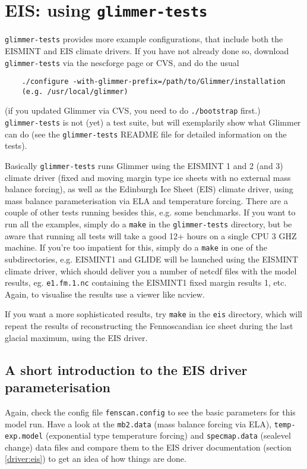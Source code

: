 
\section{EIS: using \texttt{glimmer-tests}}
\texttt{glimmer-tests} provides more example configurations, that include both the EISMINT
and EIS climate drivers. If you have not already done so, download
\texttt{glimmer-tests} via the nescforge page or CVS, and do the usual
\begin{verbatim}
    ./configure -with-glimmer-prefix=/path/to/Glimmer/installation
    (e.g. /usr/local/glimmer)
\end{verbatim}
(if you updated Glimmer via CVS, you need to do \texttt{./bootstrap} first.)\\
\texttt{glimmer-tests} is not (yet) a test suite, but will exemplarily show
what Glimmer can do (see the \texttt{glimmer-tests} README file for detailed
information on the tests).

Basically \texttt{glimmer-tests} runs Glimmer using the EISMINT 1 and 2 (and 3)
climate driver (fixed and moving margin type ice sheets with no external mass
balance forcing), as well as the Edinburgh Ice Sheet (EIS) climate driver,
using mass balance parameterisation via ELA and temperature forcing. There are
a couple of other tests running besides this, e.g. some benchmarks. If you want
to run all the examples, simply do a \texttt{make} in the
\texttt{glimmer-tests} directory, but be aware that running all tests will take a good
12+ hours on a single CPU 3 GHZ machine. If you're too impatient for this,
simply do a \texttt{make} in one of the subdirectories, e.g. EISMINT1 and GLIDE
will be launched using the EISMINT climate driver, which should deliver you a
number of netcdf files with the model results, eg. \texttt{e1.fm.1.nc}
containing the EISMINT1 fixed margin results 1, etc. Again, to visualise the
results use a viewer like ncview.

If you want a more sophisticated results, try \texttt{make} in the \texttt{eis}
directory, which will repeat the results of \cite{Hagdorn2003} reconstructing
the Fennoscandian ice sheet during the last glacial maximum, using the EIS
driver.

\subsection{A short introduction to the EIS driver parameterisation}

Again, check the config file \texttt{fenscan.config} to see the basic
parameters for this model run. Have a look at the \texttt{mb2.data} (mass
balance forcing via ELA), \texttt{temp-exp.model} (exponential type temperature
forcing) and \texttt{specmap.data} (sealevel change) data files and compare
them to the EIS driver documentation (section \ref{driver:eis}) to get an idea of how things are done.

